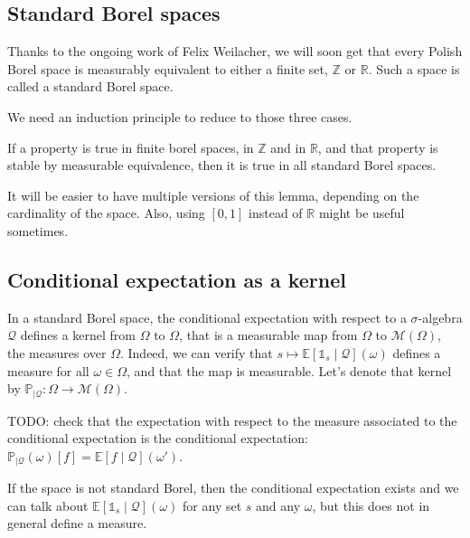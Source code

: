 
\subsection{Standard Borel spaces}
\label{sub:standard_borel_spaces}

Thanks to the ongoing work of Felix Weilacher, we will soon get that every Polish Borel space is measurably equivalent to either a finite set, $\mathbb{Z}$ or $\mathbb{R}$. Such a space is called a standard Borel space.

We need an induction principle to reduce to those three cases.

\begin{lemma}
If a property is true in finite borel spaces, in $\mathbb{Z}$ and in $\mathbb{R}$, and that property is stable by measurable equivalence, then it is true in all standard Borel spaces.
\end{lemma}

It will be easier to have multiple versions of this lemma, depending on the cardinality of the space. Also, using $[0, 1]$ instead of $\mathbb{R}$ might be useful sometimes.

\subsection{Conditional expectation as a kernel}
\label{sub:conditional_expectation_as_a_kernel}


In a standard Borel space, the conditional expectation with respect to a $\sigma$-algebra $\mathcal Q$ defines a kernel from $\Omega$ to $\Omega$, that is a measurable map from $\Omega$ to $\mathcal M(\Omega)$, the measures over $\Omega$.
Indeed, we can verify that $s \mapsto \mathbb{E}[\mathbb{1}_{s} \mid \mathcal Q](\omega)$ defines a measure for all $\omega \in \Omega$, and that the map is measurable.
Let's denote that kernel by $\mathbb{P}_{| \mathcal Q}: \Omega \to \mathcal M(\Omega)$.

TODO: check that the expectation with respect to the measure associated to the conditional expectation is the conditional expectation: $\mathbb{P}_{| \mathcal Q}(\omega)[f] = \mathbb{E}[f \mid \mathcal Q](\omega')$.

If the space is not standard Borel, then the conditional expectation exists and we can talk about $\mathbb{E}[\mathbb{1}_{s} \mid \mathcal Q](\omega)$ for any set $s$ and any $\omega$, but this does not in general define a measure.

